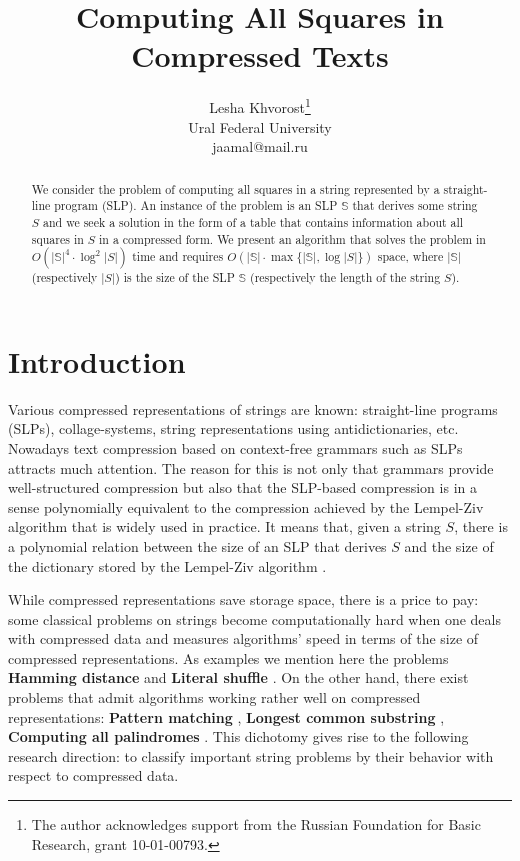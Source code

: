 \documentclass[10pt]{article}
\newcommand{\slp}[1]{\mathbb{#1}}
\begin{document}
\title{Computing All Squares in Compressed Texts}
\author{Lesha Khvorost\thanks{The author acknowledges support from the Russian Foundation for Basic Research, grant
10-01-00793.}\\
Ural Federal University\\
jaamal@mail.ru}
\date{}
\maketitle

\begin{abstract}
We consider the problem of computing all squares in a string represented by a straight-line program (SLP). An
instance of the problem is an SLP $\slp{S}$ that derives some string $S$ and we seek a solution in the form of a table
that contains information about all squares in $S$ in a compressed form. We present an algorithm that solves the
problem in $O(|\slp{S}|^4\cdot \log^2{|S|})$ time and requires $O(|\slp{S}|\cdot \max\{ |\slp{S}|, \log{|S|}\})$ space,
where $|\slp{S}|$ (respectively $|S|$) is the size of the SLP $\slp{S}$ (respectively the length of the string $S$).
\end{abstract} 

\section{Introduction}

Various compressed representations of strings are known: straight-line programs (SLPs),
collage-systems, string representations using antidictionaries, etc. Nowadays text compression
based on context-free grammars such as SLPs attracts much attention. The reason for this is not only that grammars
provide well-structured compression but also that the SLP-based compression is in a sense polynomially equivalent
to the compression achieved by the Lempel-Ziv algorithm that is widely used in practice. It means that, given a
string $S$, there is a polynomial relation between the size of an SLP that derives $S$ and the size of the
dictionary stored by the Lempel-Ziv algorithm \cite{18}.

While compressed representations save storage space, there is a price to pay: some classical problems on strings
become computationally hard when one deals with compressed data and measures algorithms' speed in terms of the
size of compressed representations. As examples we mention here the problems \textbf{Hamming distance} \cite{15} and
\textbf{Literal shuffle} \cite{4}. On the other hand, there exist problems that admit algorithms working rather well on
compressed representations: \textbf{Pattern matching} \cite{15}, \textbf{Longest common substring} \cite{16}, 
\textbf{Computing all palindromes} \cite{16}. This dichotomy gives rise to the following research direction: to
classify important string problems by their behavior with respect to compressed data.
\end{document}

